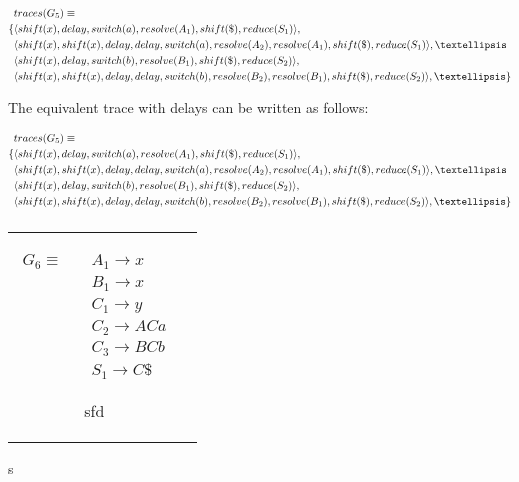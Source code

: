 \documentclass[11pt]{article}
\begin{document}
\parbox{.3\textwidth}{\begin{align*}
&traces(G_5) \equiv \\
\{ & \langle shift(x), delay, switch(a), resolve(A_1), shift(\$), reduce(S_1) \rangle,\\
   & \langle shift(x), shift(x), delay, delay, switch(a), resolve(A_2), resolve(A_1), shift(\$), reduce(S_1) \rangle, \textellipsis \\
   & \langle shift(x), delay, switch(b), resolve(B_1), shift(\$), reduce(S_2) \rangle,\\
   & \langle shift(x), shift(x), delay, delay, switch(b), resolve(B_2), resolve(B_1), shift(\$), reduce(S_2) \rangle, \textellipsis \}
\end{align*}}

The equivalent trace with delays can be written as follows:

\parbox{.3\textwidth}{\begin{align*}
&traces(G_5) \equiv \\
\{ & \langle shift(x), delay, switch(a), resolve(A_1), shift(\$), reduce(S_1) \rangle,\\
   & \langle shift(x), shift(x), delay, delay, switch(a), resolve(A_2), resolve(A_1), shift(\$), reduce(S_1) \rangle, \textellipsis \\
   & \langle shift(x), delay, switch(b), resolve(B_1), shift(\$), reduce(S_2) \rangle,\\
   & \langle shift(x), shift(x), delay, delay, switch(b), resolve(B_2), resolve(B_1), shift(\$), reduce(S_2) \rangle, \textellipsis \}
\end{align*}}

\subsubsection{}
\begin{tabular}[t]{cl}
\parbox{.3\textwidth}{
\begin{align*}
G_6 \equiv \quad & A_1 \rightarrow x\\
                 & B_1 \rightarrow x\\
                 & C_1 \rightarrow y\\
                 & C_2 \rightarrow A C a\\
                 & C_3 \rightarrow B C b\\
                 & S_1 \rightarrow C \$
\end{align*}}
\parbox{.8\textwidth}{sfd}
\end{tabular}s
\end{document}
